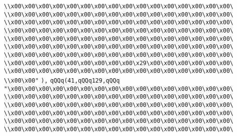 \verb|\\x00\x00\x00\x00\x00\x00\x00\x00\x00\x00\x00\x00\x00\x00\x00\x00\|\newline
\verb|\\x00\x00\x00\x00\x00\x00\x00\x00\x00\x00\x00\x00\x00\x00\x00\x00\|\newline
\verb|\\x00\x00\x00\x00\x00\x00\x00\x00\x00\x00\x00\x00\x00\x00\x00\x00\|\newline
\verb|\\x00\x00\x00\x00\x00\x00\x00\x00\x00\x00\x00\x00\x00\x00\x00\x00\|\newline
\verb|\\x00\x00\x00\x00\x00\x00\x00\x00\x00\x00\x00\x00\x00\x00\x00\x00\|\newline
\verb|\\x00\x00\x00\x00\x00\x00\x00\x00\x00\x00\x00\x00\x00\x00\x00\x00\|\newline
\verb|\\x00\x00\x00\x00\x00\x00\x00\x00\x00\x00\x00\x00\x00\x00\x00\x00\|\newline
\verb|\\x00\x00\x00\x00\x00\x00\x00\x00\x00\x29\x00\x00\x00\x00\x00\x00\|\newline
\verb|\\x00\x00\x00\x00\x00\x00\x00\x00\x00\x00\x00\x00\x00\x00\x00\x00\|\newline
\verb|\\x00\x00"|\newline
\verb|),|\newline
\verb|qQQq(41,qQQq129,qQQq|\newline
\verb|"\x00\x00\x00\x00\x00\x00\x00\x00\x00\x00\x00\x00\x00\x00\x00\x00\|\newline
\verb|\\x00\x00\x00\x00\x00\x00\x00\x00\x00\x00\x00\x00\x00\x00\x00\x00\|\newline
\verb|\\x00\x00\x00\x00\x00\x00\x00\x00\x00\x00\x00\x00\x00\x00\x00\x00\|\newline
\verb|\\x00\x00\x00\x00\x00\x00\x00\x00\x00\x00\x00\x00\x00\x00\x00\x00\|\newline
\verb|\\x00\x00\x00\x00\x00\x00\x00\x00\x00\x00\x00\x00\x00\x00\x00\x00\|\newline
\verb|\\x00\x00\x00\x00\x00\x00\x00\x00\x00\x00\x00\x00\x00\x00\x00\x00\|\newline
